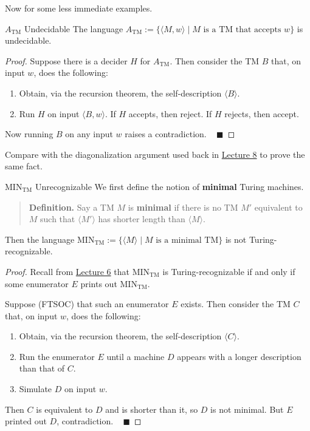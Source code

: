 Now for some less immediate examples.

\begin{theorem}{$A_{\mathrm{TM}}$ Undecidable}
    The language $A_{\mathrm{TM}} := \{\langle M, w \rangle \mid
    M \text{ is a TM that accepts } w\}$ is undecidable.
\end{theorem}

\begin{proof}
    Suppose there is a decider $H$ for $A_{\mathrm{TM}}$.
    Then consider the TM $B$ that, on input $w$,
    does the following:
    \begin{enumerate}
        \item Obtain, via the recursion theorem,
        the self-description $\langle B \rangle$.
        \item Run $H$ on input $\langle B, w \rangle$.
        If $H$ accepts, then reject.  If $H$ rejects, then accept.
    \end{enumerate}
    Now running $B$ on any input $w$
    raises a contradiction. ~ $\blacksquare$
\end{proof}

\begin{remark}
    Compare with the diagonalization argument used
    back in \href{/18.404/lectures/8/#a-tm-undecidability}{Lecture 8}
    to prove the same fact.
\end{remark}

\begin{theorem}{$\mathrm{MIN}_{\mathrm{TM}}$ Unrecognizable}
    We first define the notion of \textbf{minimal} Turing machines.
    \begin{quote}
        \textbf{Definition.}
        Say a TM $M$ is \textbf{minimal} if
        there is no TM $M'$ equivalent to $M$
        such that $\langle M' \rangle$
        has shorter length than $\langle M \rangle$.
    \end{quote}
    Then the language $\mathrm{MIN}_{\mathrm{TM}} := \{ \langle M \rangle \mid
    M \text{ is a minimal TM}\}$ is not Turing-recognizable.
\end{theorem}

\begin{proof}
    Recall from \href{/18.404/lectures/6/#enumerators-turing-machines-with-printers}{Lecture 6}
    that $\mathrm{MIN}_{\mathrm{TM}}$ is Turing-recognizable
    if and only if some enumerator $E$ prints out $\mathrm{MIN}_{\mathrm{TM}}$.

    Suppose (FTSOC) that such an enumerator $E$ exists.
    Then consider the TM $C$ that, on input $w$,
    does the following:
    \begin{enumerate}
        \item Obtain, via the recursion theorem,
        the self-description $\langle C \rangle$.
        \item Run the enumerator $E$ until
        a machine $D$ appears with a longer description
        than that of $C$.
        \item Simulate $D$ on input $w$.
    \end{enumerate}
    Then $C$ is equivalent to $D$ and is shorter than it,
    so $D$ is not minimal.
    But $E$ printed out $D$, contradiction. ~ $\blacksquare$
\end{proof}

